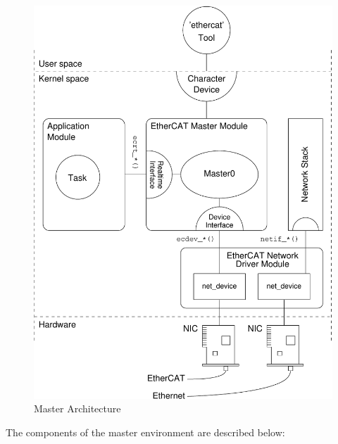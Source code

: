\documentclass[a4paper,12pt,BCOR6mm,bibtotoc,idxtotoc]{scrbook}
\begin{document}
\begin{figure}[htbp]
  \centering
  \includegraphics[width=\textwidth]{images/architecture}
  \caption{Master Architecture}
  \label{fig:arch}
\end{figure}

The components of the master environment are described below:
\end{document}
